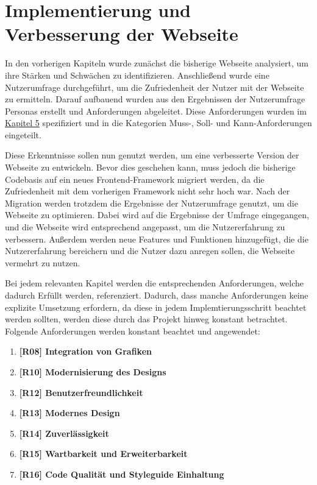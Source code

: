 
\chapter{Implementierung und Verbesserung der Webseite}
\label{chapter:6}

In den vorherigen Kapiteln wurde zunächst die bisherige Webseite analysiert, um ihre Stärken und Schwächen zu identifizieren.
Anschließend wurde eine Nutzerumfrage durchgeführt, um die Zufriedenheit der Nutzer mit der Webseite zu ermitteln.
Darauf aufbauend wurden aus den Ergebnissen der Nutzerumfrage Personas erstellt und Anforderungen abgeleitet.
Diese Anforderungen wurden im \hyperref[chapter:5]{Kapitel 5} spezifiziert und in die Kategorien Muss-, Soll- und Kann-Anforderungen eingeteilt.

Diese Erkenntnisse sollen nun genutzt werden, um eine verbesserte Version der Webseite zu entwickeln.
Bevor dies geschehen kann, muss jedoch die bisherige Codebasis auf ein neues Frontend-Framework migriert werden, da die Zufriedenheit mit dem vorherigen Framework nicht sehr hoch war.
Nach der Migration werden trotzdem die Ergebnisse der Nutzerumfrage genutzt, um die Webseite zu optimieren.
Dabei wird auf die Ergebnisse der Umfrage eingegangen, und die Webseite wird entsprechend angepasst, um die Nutzererfahrung zu verbessern.
Außerdem werden neue Features und Funktionen hinzugefügt, die die Nutzererfahrung bereichern und die Nutzer dazu anregen sollen, die Webseite vermehrt zu nutzen.

Bei jedem relevanten Kapitel werden die entsprechenden Anforderungen, welche dadurch Erfüllt werden, referenziert.
Dadurch, dass manche Anforderungen keine explizite Umsetzung erfordern, da diese in jedem Implemtierungsschritt beachtet werden sollten, werden diese durch das Projekt hinweg konstant betrachtet.
Folgende Anforderungen werden konstant beachtet und angewendet:

\begin{enumerate}

    \item \textbf{[R08] Integration von Grafiken}
    \item \textbf{[R10] Modernisierung des Designs}
    \item \textbf{[R12] Benutzerfreundlichkeit}
    \item \textbf{[R13] Modernes Design}
    \item \textbf{[R14] Zuverlässigkeit}
    \item \textbf{[R15] Wartbarkeit und Erweiterbarkeit}
    \item \textbf{[R16] Code Qualität und Styleguide Einhaltung}

\end{enumerate}

